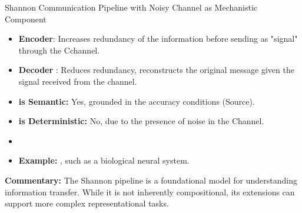 \documentclass[10pt, aspectratio=169, handout]{beamer}
\begin{document}
\begin{frame}[label=shannon_noisy]{Shannon Communication Pipeline with Noisy Channel as Mechanistic Component}
\begin{itemize}
                    \item \textbf{Encoder}: Increases redundancy of the information before sending as "signal" through the Cchannel.
                    \item \textbf{Decoder }: Reduces redundancy, reconstructs the original message given the signal received from the channel.
                    \item \textbf{is Semantic:} Yes, grounded in the accuracy conditions (Source).
                    \item \textbf{is Deterministic:} No, due to the presence of noise in the Channel.
                    \item 
                    \item \textbf{Example:} , such as a biological neural system.
                \end{itemize}

                \vspace{0.5cm}
                \textbf{Commentary:} The Shannon pipeline is a foundational model for understanding information transfer. While it is not inherently compositional, its extensions can support more complex representational tasks.
        \end{frame}
\end{document}
